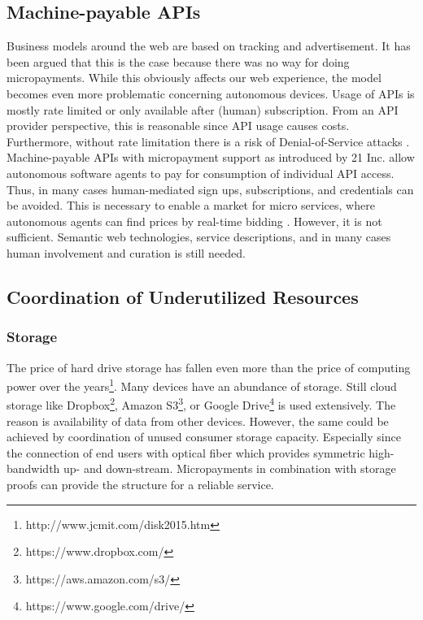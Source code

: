 \parencite{Perera:2014iz}
\parencite{Abdelwahab:2014dx}
\parencite{Sheng2013sensing}
\parencite{Distefano2012sensing}


\subsection{Machine-payable APIs}

Business models around the web are based on tracking and advertisement. It has been argued that this is the case because there was no way for doing micropayments. While this obviously affects our web experience, the model becomes even more problematic concerning autonomous devices. Usage of APIs is mostly rate limited or only available after (human) subscription. From an API provider perspective, this is reasonable since API usage causes costs. Furthermore, without rate limitation there is a risk of Denial-of-Service attacks \parencite{Needham:1993:DS:168588.168607}. Machine-payable APIs with micropayment support as introduced by 21 Inc. allow autonomous software agents to pay for consumption of individual API access. Thus, in many cases human-mediated sign ups, subscriptions, and credentials can be avoided. This is necessary to enable a market for micro services, where autonomous agents can find prices by real-time bidding . However, it is not sufficient. Semantic web technologies, service descriptions, and in many cases human involvement and curation is still needed. 

\subsection{Coordination of Underutilized Resources}


\subsubsection{Storage}

The price of hard drive storage has fallen even more than the price of computing power over the years\footnote{http://www.jcmit.com/disk2015.htm}. Many devices have an abundance of storage. Still cloud storage like Dropbox\footnote{https://www.dropbox.com/}, Amazon S3\footnote{https://aws.amazon.com/s3/}, or Google Drive\footnote{https://www.google.com/drive/} is used extensively. The reason is availability of data from other devices. However, the same could be achieved by coordination of unused consumer storage capacity. Especially since the connection of end users with optical fiber which provides symmetric high-bandwidth up- and down-stream. Micropayments in combination with storage proofs \parencite{Vorick2014sia} can provide the structure for a reliable service. 

